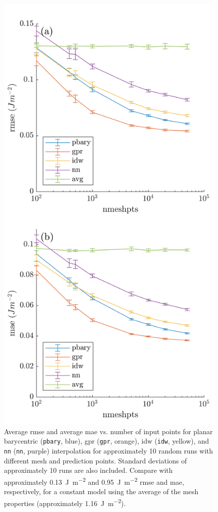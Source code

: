 \documentclass[preprint,12pt]{elsarticle}
\begin{document}
\begin{figure}
    \centering
    \includegraphics[scale=1]{brkerror.png}
    \caption{Average \gls{rmse} and average \gls{mae} vs. number of input points for planar barycentric (\texttt{pbary}, blue), \gls{gpr} (\texttt{gpr}, orange), \gls{idw} (\texttt{idw}, yellow), and \texttt{nn} (\texttt{nn}, purple) interpolation for approximately 10 random runs with different mesh and prediction points. Standard deviations of approximately 10 runs are also included. Compare with approximately \SI{0.13}{\J\per\square\meter} and \SI{0.95}{\J\per\square\meter} \gls{rmse} and \gls{mae}, respectively, for a constant model using the average of the mesh properties (approximately \SI{1.16}{\J\per\square\meter}).}

\end{figure}
\end{document}
